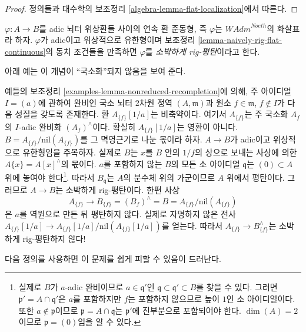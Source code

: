 \begin{proof}
정의들과 대수학의 보조정리 \ref{algebra-lemma-flat-localization}에서 따른다.
\end{proof}

\begin{definition}
\label{definition-naively-rig-flat}
$\varphi : A \to B$를 adic 뇌터 위상환들 사이의 연속 환 준동형,
즉 $\varphi$는 $\textit{WAdm}^{Noeth}$의 화살표라 하자.
$\varphi$가 adic이고 위상적으로 유한형이며 보조정리
\ref{lemma-naively-rig-flat-continuous}의 동치 조건들을 만족하면
$\varphi$를 {\it 소박하게 rig-평탄}이라고 한다.
\end{definition}

\noindent
아래 예는 이 개념이 ``국소화''되지 않음을 보여 준다.

\begin{example}
\label{example-recompletion-not-rig-flat}
예들의 보조정리 \ref{examples-lemma-nonreduced-recompletion}에 의해,
주 아이디얼 $I = (a)$에 관하여 완비인 국소 뇌터 $2$차원 정역
$(A, \mathfrak m)$과 원소 $f \in \mathfrak m$, $f \not \in I$가
다음 성질을 갖도록 존재한다. 환 $A_{\{f\}}[1/a]$는 비축약이다.
여기서 $A_{\{f\}}$는 주 국소화 $A_f$의 $I$-adic 완비화
$(A_f)^\wedge$이다. 확실히 $A_{\{f\}}[1/a]$는 영환이 아니다.
$B = A_{\{f\}}/ \text{nil}(A_{\{f\}})$를 그 멱영근기로 나눈 몫이라 하자.
$A \to B$가 adic이고 위상적으로 유한형임을 주목하자.
실제로 $B$는 $x$를 $B$ 안의 $1/f$의 상으로 보내는 사상에 의한
$A\{x\} = A[x]^\wedge$의 몫이다.
$a$를 포함하지 않는 $B$의 모든 소 아이디얼 $\mathfrak q$는
$(0) \subset A$ 위에 놓여야 한다\footnote{실제로 $B$가 $a$-adic 완비이므로
$a \in \mathfrak q'$인 $\mathfrak q \subset \mathfrak q' \subset B$를
찾을 수 있다. 그러면 $\mathfrak p' = A \cap \mathfrak q'$은 $a$를 포함하지만
$f$는 포함하지 않으므로 높이 $1$인 소 아이디얼이다.
또한 $a \not \in \mathfrak p$이므로
$\mathfrak p = A \cap \mathfrak q$는 $\mathfrak p'$에 진부분으로 포함되어야 한다.
$\dim(A) = 2$이므로 $\mathfrak p = (0)$임을 알 수 있다.}.
따라서 $B_\mathfrak q$는 $A$의 분수체 위의 가군이므로 $A$ 위에서 평탄이다.
그러므로 $A \to B$는 소박하게 rig-평탄이다.
한편 사상
$$
A_{\{f\}}
\longrightarrow
B_{\{f\}} = (B_f)^\wedge = B = A_{\{f\}} /\text{nil}(A_{\{f\}})
$$
은 $a$를 역원으로 만든 뒤 평탄하지 않다. 실제로 자명하지 않은 전사
$A_{\{f\}}[1/a] \allowbreak\to
A_{\{f\}}[1/a]\allowbreak/\text{nil}(A_{\{f\}}[1/a])$를 얻는다.
따라서 $A_{\{f\}} \to B_{\{f\}}^\wedge$는 소박하게 rig-평탄하지 않다!
\end{example}

\noindent
다음 정의를 사용하면 이 문제를 쉽게 피할 수 있음이 드러난다.

